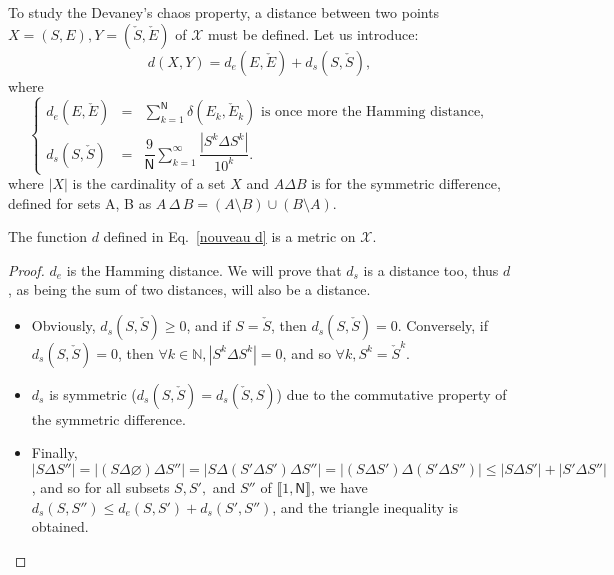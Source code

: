 \documentclass{article}
\begin{document}
To study the Devaney's chaos property, a distance between two points 
$X = (S,E), Y = (\check{S},\check{E})$ of $\mathcal{X}$ must be defined.
Let us introduce:
\begin{equation}
d(X,Y)=d_{e}(E,\check{E})+d_{s}(S,\check{S}),
\label{nouveau d}
\end{equation}
\noindent where
\begin{equation}
\left\{
\begin{array}{lll}
\displaystyle{d_{e}(E,\check{E})} & = & \displaystyle{\sum_{k=1}^{\mathsf{N}}\delta (E_{k},\check{E}_{k})}\textrm{ is once more the Hamming distance}, \\
\displaystyle{d_{s}(S,\check{S})} & = & \displaystyle{\dfrac{9}{\mathsf{N}}\sum_{k=1}^{\infty }\dfrac{|S^k\Delta {S}^k|}{10^{k}}}.\end{array}\right.
\end{equation}
where $|X|$ is the cardinality of a set $X$ and $A\Delta B$ is for the symmetric difference, defined for sets A, B as
$A\,\Delta\,B = (A \setminus B) \cup (B \setminus A)$.


\begin{proposition}
The function $d$ defined in Eq.~\ref{nouveau d} is a metric on $\mathcal{X}$.
\end{proposition}

\begin{proof}
 $d_e$ is the Hamming distance. We will prove that $d_s$ is a distance
too, thus $d$, as being the sum of two distances, will also be a distance.
 \begin{itemize}
\item Obviously, $d_s(S,\check{S})\geqslant 0$, and if $S=\check{S}$, then 
$d_s(S,\check{S})=0$. Conversely, if $d_s(S,\check{S})=0$, then 
$\forall k \in \mathds{N}, |S^k\Delta {S}^k|=0$, and so $\forall k, S^k=\check{S}^k$.
 \item $d_s$ is symmetric 
($d_s(S,\check{S})=d_s(\check{S},S)$) due to the commutative property
of the symmetric difference. 
\item Finally, $|S \Delta S''| = |(S \Delta \varnothing) \Delta S''|= |S \Delta (S'\Delta S') \Delta S''|= |(S \Delta S') \Delta (S' \Delta S'')|\leqslant |S \Delta S'| + |S' \Delta S''|$, 
and so for all subsets $S,S',$ and $S''$ of $\llbracket 1, \mathsf{N} \rrbracket$, 
we have $d_s(S,S'') \leqslant d_e(S,S')+d_s(S',S'')$, and the triangle
inequality is obtained.
 \end{itemize}
\end{proof}
\end{document}
